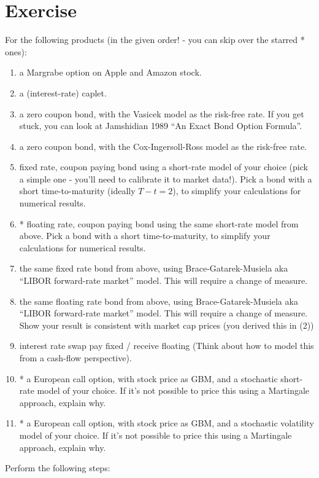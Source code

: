 \documentclass[a4paper]{article}
\begin{document}
\section*{Exercise}
For the following products (in the given order! - you can skip over the starred * ones):

\begin{enumerate}
\item a Margrabe option on Apple and Amazon stock.
\item a (interest-rate) caplet.
\item a zero coupon bond, with the Vasicek model as the risk-free rate. If you get stuck, you can look at Jamshidian 1989 ``An Exact Bond Option Formula''.
\item a zero coupon bond, with the Cox-Ingersoll-Ross model as the risk-free rate.
\item fixed rate, coupon paying bond using a short-rate model of your choice (pick a simple one - you'll need to calibrate it to market data!). Pick a bond with a short time-to-maturity (ideally $T-t = 2$), to simplify your calculations for numerical results.
\item * floating rate, coupon paying bond using the same short-rate model from above. Pick a bond with a short time-to-maturity, to simplify your calculations for numerical results.
\item the same fixed rate bond from above, using Brace-Gatarek-Musiela aka ``LIBOR forward-rate market'' model. This will require a change of measure.
\item the same floating rate bond from above, using Brace-Gatarek-Musiela aka ``LIBOR forward-rate market'' model. This will require a change of measure. Show your result is consistent with market cap prices (you derived this in (2))
\item interest rate swap pay fixed / receive floating (Think about how to model this from a cash-flow perspective).
\item * a European call option, with stock price as GBM, and a stochastic short-rate model of your choice. If it's not possible to price this using a Martingale approach, explain why.
\item * a European call option, with stock price as GBM, and a stochastic volatility model of your choice. If it's not possible to price this using a Martingale approach, explain why.
\end{enumerate}

Perform the following steps:
\end{document}
